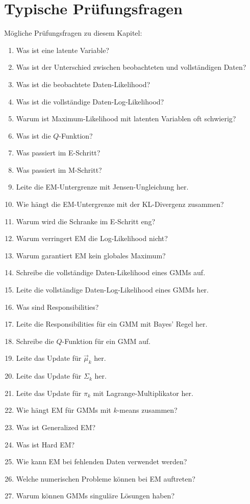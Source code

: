 \section{Typische Prüfungsfragen}

\begin{examtipbox}
Mögliche Prüfungsfragen zu diesem Kapitel:

\begin{enumerate}
    \item Was ist eine latente Variable?
    \item Was ist der Unterschied zwischen beobachteten und vollständigen Daten?
    \item Was ist die beobachtete Daten-Likelihood?
    \item Was ist die vollständige Daten-Log-Likelihood?
    \item Warum ist Maximum-Likelihood mit latenten Variablen oft schwierig?
    \item Was ist die \(Q\)-Funktion?
    \item Was passiert im E-Schritt?
    \item Was passiert im M-Schritt?
    \item Leite die EM-Untergrenze mit Jensen-Ungleichung her.
    \item Wie hängt die EM-Untergrenze mit der KL-Divergenz zusammen?
    \item Warum wird die Schranke im E-Schritt eng?
    \item Warum verringert EM die Log-Likelihood nicht?
    \item Warum garantiert EM kein globales Maximum?
    \item Schreibe die vollständige Daten-Likelihood eines GMMs auf.
    \item Leite die vollständige Daten-Log-Likelihood eines GMMs her.
    \item Was sind Responsibilities?
    \item Leite die Responsibilities für ein GMM mit Bayes' Regel her.
    \item Schreibe die \(Q\)-Funktion für ein GMM auf.
    \item Leite das Update für \(\vec{\mu}_k\) her.
    \item Leite das Update für \(\Sigma_k\) her.
    \item Leite das Update für \(\pi_k\) mit Lagrange-Multiplikator her.
    \item Wie hängt EM für GMMs mit \(k\)-means zusammen?
    \item Was ist Generalized EM?
    \item Was ist Hard EM?
    \item Wie kann EM bei fehlenden Daten verwendet werden?
    \item Welche numerischen Probleme können bei EM auftreten?
    \item Warum können GMMs singuläre Lösungen haben?
\end{enumerate}
\end{examtipbox}